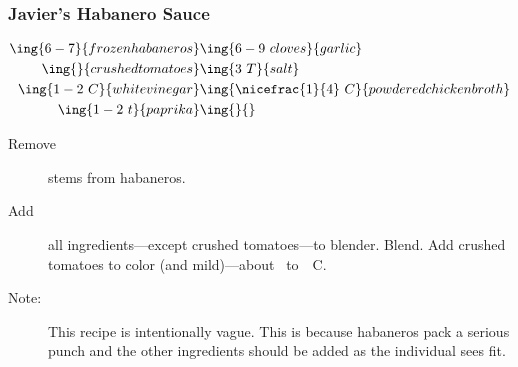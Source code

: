 \subsubsection{Javier's Habanero Sauce}

\begin{align*}
    \ing{6-7}{frozen habaneros} & \ing{6-9~cloves}{garlic} \\
    \ing{}{crushed tomatoes}    & \ing{3~T}{salt} \\
    \ing{1-2~C}{white vinegar}  & \ing{\nicefrac{1}{4}~C}{powdered chicken broth} \\
    \ing{1-2~t}{paprika}        & \ing{}{}
\end{align*}

\begin{description}
    \item[Remove]stems from habaneros.
    \item[Add]all ingredients---except crushed tomatoes---to blender. Blend. Add crushed tomatoes to color (and mild)---about ~to~~C.
    \item[Note:]This recipe is intentionally vague. This is because habaneros pack a serious punch and the other ingredients should be added as the individual sees fit.
\end{description}

\pagebreak
